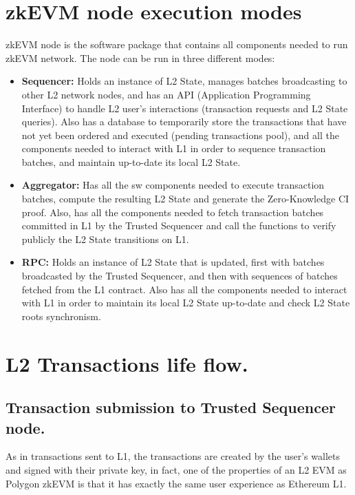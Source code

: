 \section{zkEVM node execution modes}

zkEVM node is the software package that contains all components needed to run zkEVM network. The node can be run in three different modes:
\begin{itemize}
	\item \textbf{Sequencer:} Holds an instance of L2 State, manages batches broadcasting to other L2 network nodes, and has an API (Application Programming Interface) to handle L2 user's interactions (transaction requests and L2 State queries). Also has a database to temporarily store the transactions that have not yet been ordered and executed (pending transactions pool), and all the components needed to interact with L1 in order to sequence transaction batches, and maintain up-to-date its local L2 State.
	\item \textbf{Aggregator:} Has all the sw components needed to execute transaction batches, compute the resulting L2 State and generate the Zero-Knowledge CI proof. Also, has all the components needed to fetch transaction batches committed in L1 by the Trusted Sequencer and call the functions to verify publicly the L2 State transitions on L1.
	\item \textbf{RPC:} Holds an instance of L2 State that is updated, first with batches broadcasted by the Trusted Sequencer, and then with sequences of batches fetched from the L1 contract. Also has all the components needed to interact with L1 in order to maintain its local L2 State up-to-date and check L2 State roots synchronism.
\end{itemize}

\section{L2 Transactions life flow.}

\subsection{Transaction submission to Trusted Sequencer node.}

As in transactions sent to L1, the transactions are created by the user's wallets and signed with their private key, in fact, one of the properties of an L2 EVM as Polygon zkEVM is that it has exactly the same user experience as Ethereum L1.

